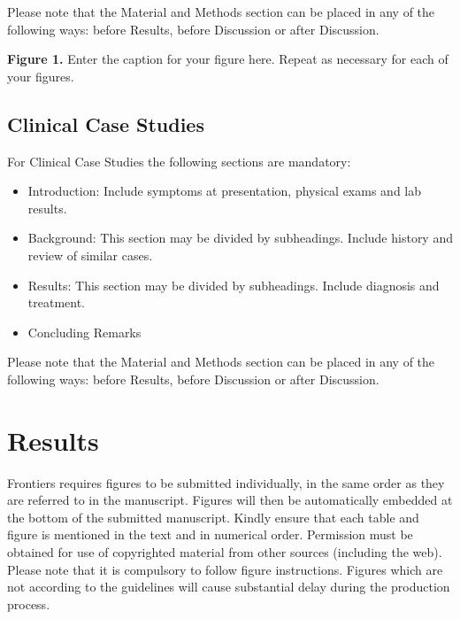 \documentclass{frontiersENG} %
\begin{document}
Please note that the Material and Methods section can be placed in any of the following ways: before Results, before Discussion or after Discussion.



\textbf{Figure 1.}{ Enter the caption for your figure here.  Repeat as  necessary for each of your figures.}\label{fig:01}%


\subsection{Clinical Case Studies}

For Clinical Case Studies the following sections are mandatory:

\begin{itemize}
\item Introduction: Include symptoms at presentation, physical exams and lab results.
\item Background: This section may be divided by subheadings. Include history and review of similar cases.
\item Results: This section may be divided by subheadings. Include diagnosis and treatment.
\item Concluding Remarks
\end{itemize}

Please note that the Material and Methods section can be placed in any of the following ways: before Results, before Discussion or after Discussion.




\section{Results}

Frontiers requires figures to be submitted individually, in the same order as they are referred to in the manuscript. Figures will then be automatically embedded at the bottom of the submitted manuscript. Kindly ensure that each table and figure is mentioned in the text and in numerical order. Permission must be obtained for use of copyrighted material from other sources (including the web). Please note that it is compulsory to follow figure instructions. Figures which are not according to the guidelines will cause substantial delay during the production process.
\end{document}
